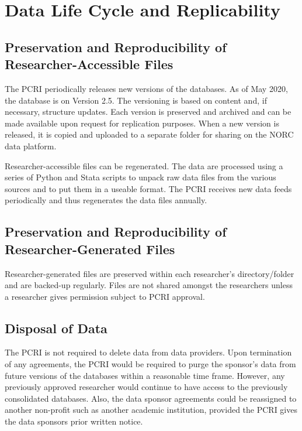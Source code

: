 \hypertarget{data-life-cycle-and-replicability-1}{%
\section{Data Life Cycle and Replicability}\label{data-life-cycle-and-replicability-1}}

\hypertarget{preservation-and-reproducibility-of-researcher-accessible-files-1}{%
\subsection{Preservation and Reproducibility of Researcher-Accessible Files}\label{preservation-and-reproducibility-of-researcher-accessible-files-1}}

The PCRI periodically releases new versions of the databases. As of May 2020, the database is on Version 2.5. The versioning is based on content and, if necessary, structure updates. Each version is preserved and archived and can be made available upon request for replication purposes. When a new version is released, it is copied and uploaded to a separate folder for sharing on the NORC data platform.

Researcher-accessible files can be regenerated. The data are processed using a series of Python and Stata scripts to unpack raw data files from the various sources and to put them in a useable format. The PCRI receives new data feeds periodically and thus regenerates the data files annually.

\hypertarget{preservation-and-reproducibility-of-researcher-generated-files-1}{%
\subsection{Preservation and Reproducibility of Researcher-Generated Files}\label{preservation-and-reproducibility-of-researcher-generated-files-1}}

Researcher-generated files are preserved within each researcher's directory/folder and are backed-up regularly. Files are not shared amongst the researchers unless a researcher gives permission subject to PCRI approval.

\hypertarget{disposal-of-data}{%
\subsection{Disposal of Data}\label{disposal-of-data}}

The PCRI is not required to delete data from data providers. Upon termination of any agreements, the PCRI would be required to purge the sponsor's data from future versions of the databases within a reasonable time frame. However, any previously approved researcher would continue to have access to the previously consolidated databases. Also, the data sponsor agreements could be reassigned to another non-profit such as another academic institution, provided the PCRI gives the data sponsors prior written notice.

